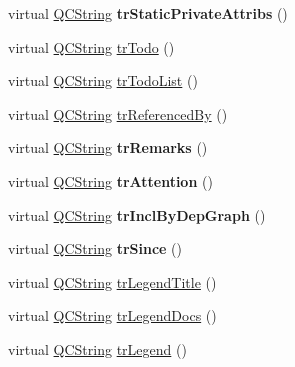 \begin{DoxyCompactItemize}
\item 
\mbox{\label{class_translator_serbian_a0f8ddfee7c5e309adcf783ffb078a511}} 
virtual \mbox{\hyperlink{class_q_c_string}{Q\+C\+String}} {\bfseries tr\+Static\+Private\+Attribs} ()
\item 
virtual \mbox{\hyperlink{class_q_c_string}{Q\+C\+String}} \mbox{\hyperlink{class_translator_serbian_aafb2072e6363c89863e60d55b3ab13fb}{tr\+Todo}} ()
\item 
virtual \mbox{\hyperlink{class_q_c_string}{Q\+C\+String}} \mbox{\hyperlink{class_translator_serbian_a52c02e96193db043a4d10ad468bc97e9}{tr\+Todo\+List}} ()
\item 
virtual \mbox{\hyperlink{class_q_c_string}{Q\+C\+String}} \mbox{\hyperlink{class_translator_serbian_ab87f76e14343a125150ff761380df112}{tr\+Referenced\+By}} ()
\item 
\mbox{\label{class_translator_serbian_a648d5111bd4d3b4bd4f9c3c2654b3e7b}} 
virtual \mbox{\hyperlink{class_q_c_string}{Q\+C\+String}} {\bfseries tr\+Remarks} ()
\item 
\mbox{\label{class_translator_serbian_af2492c63500aeb52e668b733a3002161}} 
virtual \mbox{\hyperlink{class_q_c_string}{Q\+C\+String}} {\bfseries tr\+Attention} ()
\item 
\mbox{\label{class_translator_serbian_ade439d06dd63132084bc6125beddcefe}} 
virtual \mbox{\hyperlink{class_q_c_string}{Q\+C\+String}} {\bfseries tr\+Incl\+By\+Dep\+Graph} ()
\item 
\mbox{\label{class_translator_serbian_a260168dd7bfb7b3a874d9dada8fbcf17}} 
virtual \mbox{\hyperlink{class_q_c_string}{Q\+C\+String}} {\bfseries tr\+Since} ()
\item 
virtual \mbox{\hyperlink{class_q_c_string}{Q\+C\+String}} \mbox{\hyperlink{class_translator_serbian_a783408f55230a0502bb8bfdd13d193ad}{tr\+Legend\+Title}} ()
\item 
virtual \mbox{\hyperlink{class_q_c_string}{Q\+C\+String}} \mbox{\hyperlink{class_translator_serbian_ad0a3e59f9fb3377e6af526f8f2a6eab9}{tr\+Legend\+Docs}} ()
\item 
virtual \mbox{\hyperlink{class_q_c_string}{Q\+C\+String}} \mbox{\hyperlink{class_translator_serbian_ade75094177318f78da1b3f28b16ae63c}{tr\+Legend}} ()

\end{DoxyCompactItemize}

